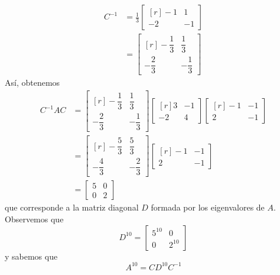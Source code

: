 \begin{example}
    \begin{align*}
        C^{-1} & = \frac{1}{3} \begin{bmatrix*}[r]
            -1 & 1 \\
            -2 & -1
        \end{bmatrix*} \\
        & = \begin{bmatrix*}[r]
            -\dfrac{1}{3} & \dfrac{1}{3} \\[2mm]
            -\dfrac{2}{3} & -\dfrac{1}{3}
        \end{bmatrix*}
    \end{align*}
    Así, obtenemos
    \begin{align*}
        C^{-1}AC & = \begin{bmatrix*}[r]
            -\dfrac{1}{3} & \dfrac{1}{3} \\[2mm]
            -\dfrac{2}{3} & -\dfrac{1}{3}
        \end{bmatrix*} \begin{bmatrix*}[r]
            3 & - 1 \\
            -2 & 4
        \end{bmatrix*} \begin{bmatrix*}[r]
            -1 & -1 \\
            2 & -1
        \end{bmatrix*} \\
        & = \begin{bmatrix*}[r]
            -\dfrac{5}{3} & \dfrac{5}{3} \\[2mm]
            -\dfrac{4}{3} & -\dfrac{2}{3}
        \end{bmatrix*} \begin{bmatrix*}[r]
            -1 & -1 \\
            2 & -1
        \end{bmatrix*} \\
        & = \begin{bmatrix}
            5 & 0 \\
            0 & 2
        \end{bmatrix}
    \end{align*}
    que corresponde a la matriz diagonal $D$ formada por los eigenvalores de $A$. Observemos que
    $$D^{10} = \begin{bmatrix}
        5^{10} & 0 \\
        0 & 2^{10}
    \end{bmatrix}$$
    y sabemos que
    $$A^{10} = CD^{10}C^{-1}$$

\end{example}
